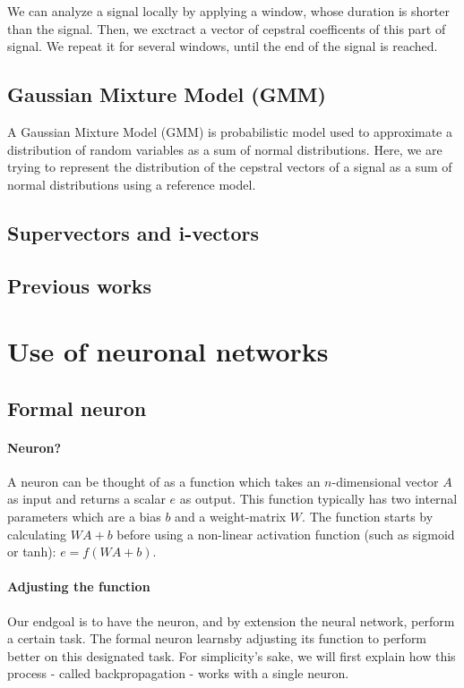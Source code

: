 \documentclass[conference]{IEEEtran}
\begin{document}
We can analyze a signal locally by applying a window, whose duration is shorter than the signal. Then, we exctract a vector of cepstral coefficents of this part of signal. We repeat it for several windows, until the end of the signal is reached.



\subsection{Gaussian Mixture Model (GMM)}

A Gaussian Mixture Model (GMM) is probabilistic model used to approximate a distribution of random variables as a sum of normal distributions. Here, we are trying to represent the distribution of the cepstral vectors of a signal as a sum of normal distributions using a reference model.



\subsection{Supervectors and i-vectors}

\subsection{Previous works}

\section{Use of neuronal networks}

\subsection{Formal neuron}

\paragraph{Neuron?}
A neuron can be thought of as a function which takes an $n$-dimensional vector $A$ as input and returns a scalar $e$ as output. This function typically has two internal parameters which are a bias $b$ and a weight-matrix $W$. The function starts by calculating $WA+b$ before using a non-linear activation function (such as sigmoid or tanh): $e=f(WA+b)$.

\paragraph{Adjusting the function}
Our endgoal is to have the neuron, and by extension the neural network, perform
a certain task. The formal neuron \og learns\fg by adjusting its function to perform better on
this designated task. For simplicity's sake, we will first explain how this
process - called \og backpropagation\fg{} - works with a single neuron.
\end{document}
